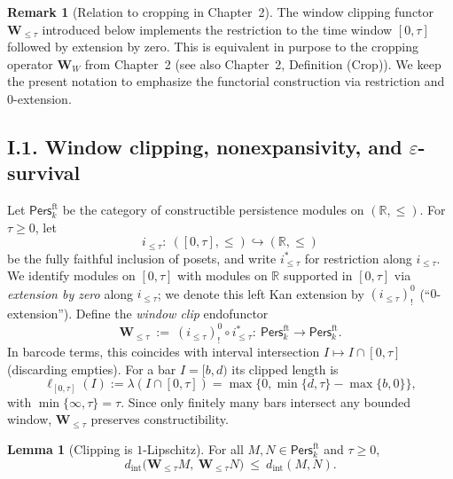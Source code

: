 \documentclass[11pt]{article}
\numberwithin{equation}{section}
\theoremstyle{plain}
\theoremstyle{definition}
\theoremstyle{remark}
\newcommand{\Pers}{\mathsf{Pers}}
\theoremstyle{plain}
\theoremstyle{definition}
\numberwithin{equation}{section}
\newtheorem{lemma}[theorem]{Lemma}
\theoremstyle{definition}
\newtheorem{remark}[theorem]{Remark}
\numberwithin{equation}{section}
\theoremstyle{plain}
\theoremstyle{definition}
\theoremstyle{remark}
\newcommand{\Crop}{\mathbf{W}}
\begin{document}
\begin{remark}[Relation to cropping in Chapter~2]\label{I:rk:crop-ref}
The window clipping functor \(\mathbf{W}_{\le\tau}\) introduced below implements the restriction to the time window \([0,\tau]\) followed by extension by zero. This is equivalent in purpose to the cropping operator \(\Crop_W\) from Chapter~2 (see also Chapter~2, Definition (Crop)). We keep the present notation to emphasize the functorial construction via restriction and \(0\)-extension.
\end{remark}

\subsection*{I.1. Window clipping, nonexpansivity, and \texorpdfstring{$\varepsilon$}{epsilon}-survival}

Let \(\Pers^{\mathrm{ft}}_k\) be the category of constructible persistence modules on \((\mathbb{R},\le)\). For \(\tau\ge 0\), let
\[
i_{\le\tau}:\ ([0,\tau],\le)\hookrightarrow(\mathbb{R},\le)
\]
be the fully faithful inclusion of posets, and write \(i_{\le\tau}^{\ast}\) for restriction along \(i_{\le\tau}\).
We identify modules on \([0,\tau]\) with modules on \(\mathbb{R}\) supported in \([0,\tau]\) via \emph{extension by zero} along \(i_{\le\tau}\); we denote this left Kan extension by \((i_{\le\tau})^{0}_!\) (``\(0\)-extension''). Define the \emph{window clip} endofunctor
\[
\mathbf{W}_{\le \tau}\ :=\ (i_{\le\tau})^{0}_!\circ i_{\le\tau}^{\ast}:\ \Pers^{\mathrm{ft}}_k\longrightarrow \Pers^{\mathrm{ft}}_k.
\]
In barcode terms, this coincides with interval intersection \(I\mapsto I\cap[0,\tau]\) (discarding empties). For a bar \(I=[b,d)\) its clipped length is
\[
\ell_{[0,\tau]}(I):=\lambda\!\left(I\cap[0,\tau]\right)=\max\{0,\min\{d,\tau\}-\max\{b,0\}\},
\]
with \(\min\{\infty,\tau\}=\tau\). Since only finitely many bars intersect any bounded window, \(\mathbf{W}_{\le\tau}\) preserves constructibility.

\begin{lemma}[Clipping is \(1\)-Lipschitz]\label{I:lem:clip-1lip}
For all \(M,N\in\Pers^{\mathrm{ft}}_k\) and \(\tau\ge 0\),
\[
d_{\mathrm{int}}\bigl(\mathbf{W}_{\le \tau}M,\ \mathbf{W}_{\le \tau}N\bigr)\ \le\ d_{\mathrm{int}}(M,N).
\]
\end{lemma}
\end{document}
